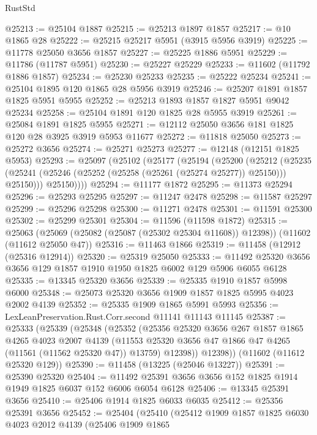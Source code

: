 \begin{lexlean}{RustStd}
\begin{coremodule}
@25213 := @25104 @1887
@25215 := @25213 @1897 @1857
@25217 := @10 @1865 @28
@25222 := @25215 @25217 @5951 (@3915 @5956 @3919)
@25225 := @11778 @25050 @3656 @1857
@25227 := @25225 @1886 @5951
@25229 := @11786 (@11787 @5951)
@25230 := @25227 @25229
@25233 := @11602 (@11792 @1886 @1857)
@25234 := @25230 @25233
@25235 := @25222 @25234
@25241 := @25104 @1895 @120 @1865 @28 @5956 @3919
@25246 := @25207 @1891 @1857 @1825 @5951 @5955
@25252 := @25213 @1893 @1857 @1827 @5951 @9042 @25234
@25258 := @25104 @1891 @120 @1825 @28 @5955 @3919
@25261 := @25084 @1891 @1825 @5955
@25271 := @12112 @25050 @3656 @181 @1825 @120 @28 @3925 @3919 @5953 @11677
@25272 := @11818 @25050
@25273 := @25272 @3656
@25274 := @25271 @25273
@25277 := @12148 (@12151 @1825 @5953)
@25293 := @25097
    (@25102
      (@25177
        (@25194
          (@25200
            (@25212
              (@25235 (@25241 (@25246 (@25252 (@25258 (@25261 (@25274 @25277)) @25150))) @25150)))
            @25150))))
@25294 := @11177 @1872
@25295 := @11373 @25294
@25296 := @25293 @25295
@25297 := @11247 @2478
@25298 := @11587 @25297
@25299 := @25296 @25298
@25300 := @11271 @2478
@25301 := @11591 @25300
@25302 := @25299 @25301
@25304 := @11596 (@11598 @1872)
@25315 := @25063
    (@25069 (@25082 (@25087 (@25302 @25304 @11608)) @12398))
    (@11602 (@11612 @25050 @47))
@25316 := @11463 @1866
@25319 := @11458 (@12912 (@25316 @12914))
@25320 := @25319 @25050
@25333 := @11492 @25320 @3656 @3656 @129 @1857 @1910 @1950 @1825 @6002 @129 @5906 @6055 @6128
@25335 := @13345 @25320 @3656
@25339 := @25335 @1910 @1857 @5998 @6000
@25348 := @25073 @25320 @3656 @1909 @1857 @1825 @5995 @4023 @2002 @4139
@25352 := @25335 @1909 @1865 @5991 @5993
@25356 := LexLeanPreservation.Rust.Corr.second @11141 @11143 @11145
@25387 := @25333
    (@25339
      (@25348
        (@25352
          (@25356
            @25320
            @3656
            @267
            @1857
            @1865
            @4265
            @4023
            @2007
            @4139
            (@11553 @25320 @3656 @47 @1866 @47 @4265 (@11561 (@11562 @25320 @47)) @13759)
            @12398))
        @12398))
    (@11602 (@11612 @25320 @129))
@25390 := @11458 (@13225 (@25046 @13227))
@25391 := @25390 @25320
@25404 := @11492 @25391 @3656 @3656 @152 @1825 @1914 @1949 @1825 @6037 @152 @6006 @6054 @6128
@25406 := @13345 @25391 @3656
@25410 := @25406 @1914 @1825 @6033 @6035
@25412 := @25356 @25391 @3656
@25452 := @25404
    (@25410
      (@25412
        @1909
        @1857
        @1825
        @6030
        @4023
        @2012
        @4139
        (@25406
          @1909
          @1865

\end{coremodule}
\end{lexlean}
